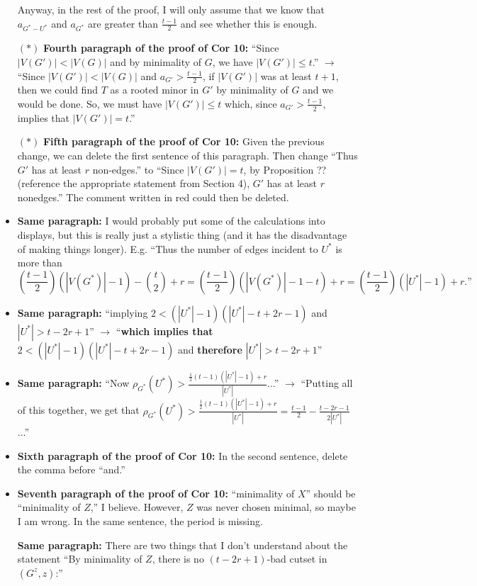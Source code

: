\documentclass[11 pt]{article}
\theoremstyle{definition}
\theoremstyle{case}
\numberwithin{equation}{section}
\begin{document}
\begin{itemize}
Anyway, in the rest of the proof, I will only assume that we know that $a_{G^*-U^*}$ and $a_{G^*}$ are greater than $\frac{t-1}{2}$ and see whether this is enough.
\item[$\boldsymbol{(*)}$] \textbf{Fourth paragraph of the proof of Cor 10:} ``Since $|V(G')|<|V(G)|$ and by minimality of $G$, we have $|V(G')|\leq t$.'' $\to$ ``Since $|V(G')|<|V(G)|$ and $a_{G'}>\frac{t-1}{2}$, if $|V(G')|$ was at least $t+1$, then we could find $T$ as a rooted minor in $G'$ by minimality of $G$ and we would be done. So, we must have $|V(G')|\leq t$ which, since $a_{G'}>\frac{t-1}{2}$,  implies that $|V(G')|=t$.''
\item[$\boldsymbol{(*)}$] \textbf{Fifth paragraph of the proof of Cor 10:} Given the previous change, we can delete the first sentence of this paragraph. Then change ``Thus $G'$ has at least $r$ non-edges.'' to ``Since $|V(G')|=t$, by Proposition ?? (reference the appropriate statement from Section 4), $G'$ has at least $r$ nonedges.'' The comment written in red could then be deleted. 
\item \textbf{Same paragraph:} I would probably put some of the calculations into displays, but this is really just a stylistic thing (and it has the disadvantage of making things longer). E.g. ``Thus the number of edges incident to $U^*$ is more than
\[\left(\frac{t-1}{2}\right)(|V(G^*)|-1)-\binom{t}{2} + r = \left(\frac{t-1}{2}\right)(|V(G^*)|-1-t)+r = \left(\frac{t-1}{2}\right)(|U^*|-1)+r.\text{''}\]
\item \textbf{Same paragraph:} ``implying $2<(|U^*|-1)(|U^*|-t+2r-1)$ and $|U^*| > t-2r+1$'' $\to$ ``\textbf{which implies that} $2<(|U^*|-1)(|U^*|-t+2r-1)$ and \textbf{therefore} $|U^*| > t-2r+1$''
\item \textbf{Same paragraph:} ``Now $\rho_{G^*}(U^*)>\frac{\frac{1}{2}(t-1)(|U^*|-1)+r}{|U^*|}$...'' $\to$ ``Putting all of this together, we get that $\rho_{G^*}(U^*)>\frac{\frac{1}{2}(t-1)(|U^*|-1)+r}{|U^*|} = \frac{t-1}{2}  - \frac{t-2r-1}{2|U^*|}$...''
\item \textbf{Sixth paragraph of the proof of Cor 10:} In the second sentence, delete the comma before ``and.''
\item \textbf{Seventh paragraph of the proof of Cor 10:} ``minimality of $X$'' should be ``minimality of $Z$,'' I believe. However, $Z$ was never chosen minimal, so maybe I am wrong. In the same sentence, the period is missing. 
\item[\color{red}{$\boldsymbol{(**)}$}] \textbf{Same paragraph:} There are two things that I don't understand about the statement ``By minimality of $Z$, there is no $(t-2r+1)$-bad cutset in $(G^z,z)$:''

\end{itemize}
\end{document}
